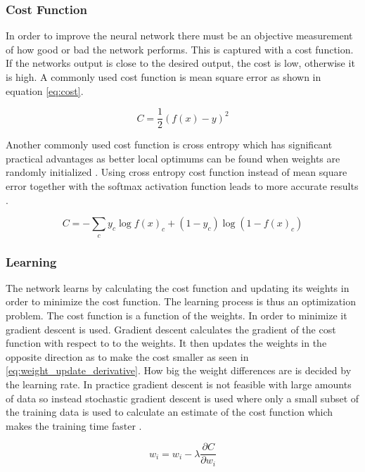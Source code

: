 \documentclass{kththesis}
\begin{document}
\subsubsection{Cost Function}
In order to  improve the neural network  there must be an objective measurement of how good or bad the network performs. This is captured with a cost function. If the networks output is close to the desired output, the cost is low, otherwise it is high. A commonly used cost function is mean square error as shown in equation \ref{eq:cost}. 

\begin{equation}
\label{eq:cost}
C =\frac{1}{2}(f(x)-y)^2
\end{equation}

Another commonly used cost function is cross entropy which has significant practical advantages as better local optimums can be found when weights are randomly initialized \cite{golik2013cross, kline2005revisiting}. Using cross entropy cost function instead of mean square error together with the softmax activation function leads to more accurate results \cite{dunne1997pairing}.

\begin{equation}
\label{eq:cross_entropy}
C = -\sum_{c}y_c\log{f(x)_c}+(1-y_c)\log{(1-f(x)_c)}
\end{equation}

\subsubsection{Learning}
The network learns by calculating the cost function and updating its weights in order to minimize the cost function. The learning process is thus an optimization problem.  The cost function is a function of the weights. In order to minimize it gradient descent is used. Gradient descent  calculates the gradient of the cost function with respect to to the weights. It then updates the weights in the opposite direction as to make the cost smaller as seen in \ref{eq:weight_update_derivative}. How big the weight differences are is  decided by the learning rate. In practice gradient descent is not feasible with large amounts of data so instead stochastic gradient descent is used where only a small subset of the training data is used to calculate an estimate of the cost function which makes the training time faster \cite{michaelnielsen2015}. 

\begin{equation}
\label{eq:weight_update_derivative}
w_i= w_i-\lambda\frac{\partial{C}}{\partial{w_i}}
\end{equation}
\end{document}
